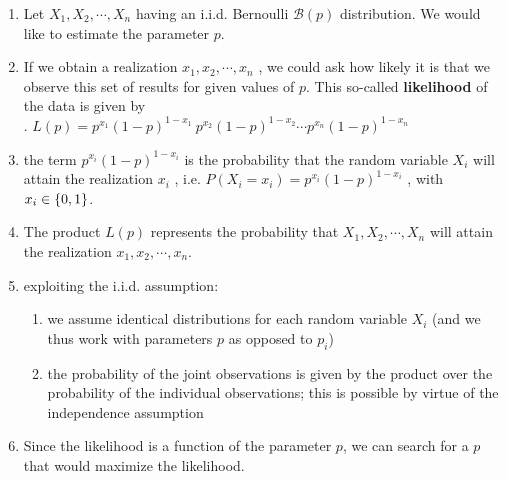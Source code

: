\begin{enumerate}
    \item Let $X_1 , X_2, \cdots , X_ n$ having an i.i.d. Bernoulli $\mathcal{B} ( p)$ distribution.
    We would like to estimate the parameter $p$.
    \hfill \cite{statistics/book/Statistics-for-Data-Scientists/Maurits-Kaptein}

    \item If we obtain a realization $x_1 , x_2, \cdots , x _n$ , we could ask how likely it is that we observe this set of results for given values of $p$.
    This so-called \textbf{likelihood} of the data is given by
    \hfill \cite{statistics/book/Statistics-for-Data-Scientists/Maurits-Kaptein}
    \\
    .\hfill
    $
        L ( p)
        = p^ {x_1} (1 - p)^{1-x_1}\ p ^{x_2} (1 - p)^{1-x_2} \cdots p ^{x_n} (1 - p)^{1-x_n}
    $
    \hfill \cite{statistics/book/Statistics-for-Data-Scientists/Maurits-Kaptein}

    \item the term $p^ {x _i} (1 - p)^{1-x_i}$ is the probability that the random variable $X _i$ will attain the realization $x _i$ , i.e. $P (X _i = x _i ) = p^ {x _i} (1 - p)^{1-x_i}$ , with $x_ i \in \left\{0, 1\right\}$.
    \hfill \cite{statistics/book/Statistics-for-Data-Scientists/Maurits-Kaptein}

    \item The product $L ( p)$ represents the probability that $X_1 , X_2, \cdots , X _n$ will attain the realization $x_1 , x_2, \cdots , x _n$.
    \hfill \cite{statistics/book/Statistics-for-Data-Scientists/Maurits-Kaptein}

    \item exploiting the i.i.d. assumption:
    \begin{enumerate}
        \item we assume identical distributions for each random variable $X _i$ (and we thus work with parameters $p$ as opposed to $p_i$)
        \hfill \cite{statistics/book/Statistics-for-Data-Scientists/Maurits-Kaptein}

        \item the probability of the joint observations is given by the product over the probability of the individual observations; this is possible by virtue of the independence assumption
        \hfill \cite{statistics/book/Statistics-for-Data-Scientists/Maurits-Kaptein}
    \end{enumerate}

    \item Since the likelihood is a function of the parameter $p$, we can search for a $p$ that would maximize the likelihood.
    \hfill \cite{statistics/book/Statistics-for-Data-Scientists/Maurits-Kaptein}


\end{enumerate}
